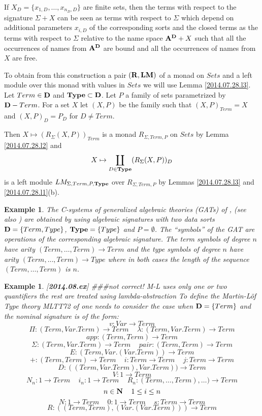\documentclass[11pt]{article}
\newtheorem{example}[proposition]{Example}
\newcommand{\llabel}[1]{\label{#1}[{\bf #1}]}
\newcommand{\sr}{\rightarrow}
\newcommand{\nn}{{\bf N\rm}}
\newcommand{\nat}{\nn}
\newcommand{\rr}{{\bf R}}
\newcommand{\lm}{{\bf LM}}
\newcommand{\spc}{{\,\,\,\,\,\,\,}}
\begin{document}
{If $X_D=\{x_{1,D},\dots,x_{n_D,D}\}$ are finite sets, then the terms with respect to the signature $\Sigma+X$ can be seen as terms with respect to $\Sigma$ which depend on additional parameters $x_{i,D}$ of the corresponding sorts and the closed terms as the terms with respect to $\Sigma$ relative to the name space ${\bf A}^{\bf D}+X$ such that all the occurrences of names from ${\bf A}^{\bf D}$ are bound and all the occurrences of names from $X$ are free. 

To obtain from this construction a pair $(\rr,\lm)$ of a monad on $Sets$ and a left module over this monad with values in $Sets$ we will use Lemma \ref{2014.07.28.l3}. Let $Term\in{\bf D}$ and ${\bf Type}\subset{\bf D}$. Let $P$ a family of sets parametrized by ${\bf D}-{Term}$. For a set $X$ let $(X,P)$ be the family such that $(X,P)_{Term}=X$ and $(X,P)_{D}=P_{D}$ for $D\ne Term$. 

Then $X\mapsto (R_{\Sigma}(X,P))_{Term}$ is a monad $R_{\Sigma,Term,P}$ on $Sets$ by Lemma \ref{2014.07.28.l2} and 
%
$$X\mapsto \coprod_{D\in {\bf Type}} (R_{\Sigma}(X,P))_D$$
%
is a left module $LM_{\Sigma,Term,P,{\bf Type}}$ over $R_{\Sigma,Term,P}$ by Lemmas \ref{2014.07.28.l3} and \ref{2014.07.28.l1}(b). 
%
\begin{example}\rm
The C-systems of generalized algebraic theories (GATs) of \cite{Cartmell0},\cite{Cartmell1} (see also \cite{Garner}) are obtained by using algebraic signatures with two data sorts ${\bf D}=\{Term,Type\}$, ${\bf Type}=\{Type\}$ and $P=\emptyset$. The ``symbols'' of the GAT are operations of the corresponding algebraic signature. The term symbols of degree $n$ have arity $(Term,\dots,Term)\sr Term$ and the type symbols of degree $n$ have arity $(Term,\dots,Term)\sr Type$ where in both cases the length of the sequence $(Term,\dots,Term)$ is $n$. 
\end{example}
%
\begin{example}
\llabel{2014.08.ex}\rm
###not correct! M-L uses only one or two quantifiers the rest are treated using lambda-abstraction
To define the Martin-L\"{o}f Type theory MLTT72 of \cite{ML72}  one needs to consider the case when ${\bf D}=\{Term\}$ and the nominal signature is of the form:
%
$$v:Var\sr Term$$
$$\Pi:(Term, Var.Term)\sr Term\spc\lambda:(Term,Var.Term)\sr Term$$ $$app:(Term,Term)\sr Term$$
$$\Sigma:(Term,Var.Term)\sr Term\spc pair:(Term,Term)\sr Term$$ $$E:(Term,Var.(Var.Term))\sr Term$$
$$+:(Term,Term)\sr Term\spc i:Term\sr Term\spc j:Term\sr Term$$ $$D:((Term,Var.Term),Var.Term))\sr Term$$
$$V:1\sr Term$$
$$N_n:1\sr Term\spc i_n:1\sr Term\spc R_n:(Term,\dots,Term),\dots)\sr Term$$ $$n\in\nat\spc 1\le i \le n$$
$$N:1\sr Term\spc 0:1\sr Term\spc s:Term\sr Term$$ $$R:((Term,Term),(Var.(Var.Term)))\sr Term$$


\end{example}}
\end{document}
